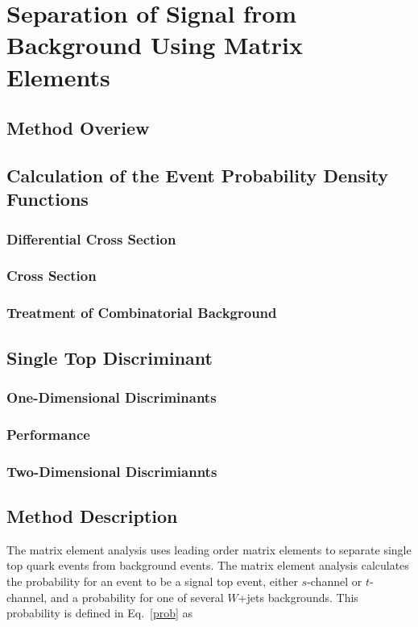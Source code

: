 \section{Separation of Signal from Background Using Matrix Elements}
\label{separation-ME}

\subsection{Method Overiew}
\subsection{Calculation of the Event Probability Density Functions}
\subsubsection{Differential Cross Section}
\subsubsection{Cross Section}
\subsubsection{Treatment of Combinatorial Background}
\subsection{Single Top Discriminant}
\subsubsection{One-Dimensional Discriminants}
\subsubsection{Performance}
\subsubsection{Two-Dimensional Discrimiannts}


\subsection{Method Description}
The matrix element analysis uses leading order matrix elements to separate
single top quark events from background events. The matrix
element analysis calculates the probability for an event to be a signal top event,
either $s$-channel or $t$-channel, and a probability for one of several $W$+jets
backgrounds. This probability is defined in Eq.~\ref{prob} as

